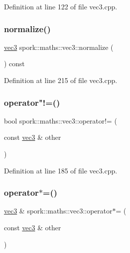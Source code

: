 Definition at line 122 of file vec3.\+cpp.

\mbox{\label{structspork_1_1maths_1_1vec3_ae18f204e08b6a509e4b68aa347ec5b1c}} 
\subsubsection{\texorpdfstring{normalize()}{normalize()}}
{\footnotesize\ttfamily \hyperlink{structspork_1_1maths_1_1vec3}{vec3} spork\+::maths\+::vec3\+::normalize (\begin{DoxyParamCaption}{ }\end{DoxyParamCaption}) const}



Definition at line 215 of file vec3.\+cpp.

\mbox{\label{structspork_1_1maths_1_1vec3_a668814674a68610b637e01414a2f02b3}} 
\subsubsection{\texorpdfstring{operator"!=()}{operator!=()}}
{\footnotesize\ttfamily bool spork\+::maths\+::vec3\+::operator!= (\begin{DoxyParamCaption}\item[{const \hyperlink{structspork_1_1maths_1_1vec3}{vec3} \&}]{other }\end{DoxyParamCaption})}



Definition at line 185 of file vec3.\+cpp.

\mbox{\label{structspork_1_1maths_1_1vec3_a694ed540bafe10f65016d143bfd9fb36}} 
\subsubsection{\texorpdfstring{operator$\ast$=()}{operator*=()}}
{\footnotesize\ttfamily \hyperlink{structspork_1_1maths_1_1vec3}{vec3} \& spork\+::maths\+::vec3\+::operator$\ast$= (\begin{DoxyParamCaption}\item[{const \hyperlink{structspork_1_1maths_1_1vec3}{vec3} \&}]{other }\end{DoxyParamCaption})}



